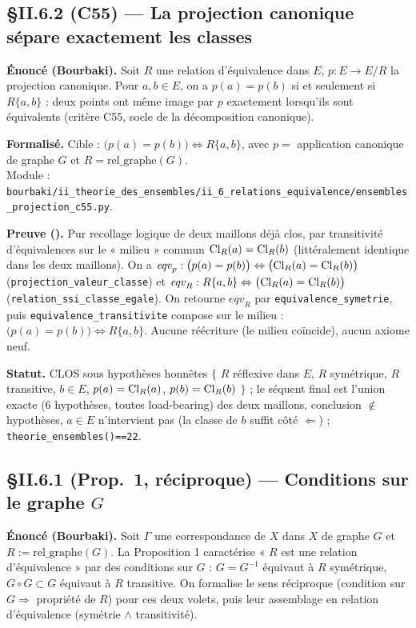 
\subsection{§II.6.2 (C55) --- La projection canonique sépare exactement les classes}
\textbf{Énoncé (Bourbaki).} Soit $R$ une relation d'équivalence dans $E$, $p : E \to E/R$ la
projection canonique. Pour $a, b \in E$, on a $p(a) = p(b)$ si et seulement si $R\{a,b\}$ :
deux points ont même image par $p$ exactement lorsqu'ils sont équivalents (critère C55, socle
de la décomposition canonique).

\textbf{Formalisé.} Cible : $\bigl(p(a) = p(b)\bigr) \Leftrightarrow R\{a,b\}$, avec
$p = $ application canonique de graphe $G$ et $R = \mathrm{rel\_graphe}(G)$. \\
Module : \texttt{bourbaki/ii\_theorie\_des\_ensembles/ii\_6\_relations\_equivalence/ensembles\_projection\_c55.py}.

\textbf{Preuve (\Nstar).} Pur recollage logique de deux maillons déjà clos, par transitivité
d'équivalences sur le « milieu » commun $\mathrm{Cl}_R(a) = \mathrm{Cl}_R(b)$ (littéralement identique dans les
deux maillons). On a $\mathit{eqv}_p : \bigl(p(a)=p(b)\bigr) \Leftrightarrow \bigl(\mathrm{Cl}_R(a)=\mathrm{Cl}_R(b)\bigr)$
(\texttt{projection\_valeur\_classe}) et $\mathit{eqv}_R : R\{a,b\} \Leftrightarrow \bigl(\mathrm{Cl}_R(a)=\mathrm{Cl}_R(b)\bigr)$
(\texttt{relation\_ssi\_classe\_egale}). On retourne $\mathit{eqv}_R$ par \texttt{equivalence\_symetrie},
puis \texttt{equivalence\_transitivite} compose sur le milieu : $\bigl(p(a)=p(b)\bigr) \Leftrightarrow R\{a,b\}$.
Aucune réécriture (le milieu coïncide), aucun axiome neuf.

\textbf{Statut.} CLOS sous hypothèses honnêtes $\{$ $R$ réflexive dans $E$, $R$ symétrique, $R$
transitive, $b \in E$, $p(a) = \mathrm{Cl}_R(a)$, $p(b) = \mathrm{Cl}_R(b)$ $\}$ ; le séquent final est l'union exacte
(6 hypothèses, toutes load-bearing) des deux maillons, conclusion $\notin$ hypothèses, $a \in E$
n'intervient pas (la classe de $b$ suffit côté $\Leftarrow$) ; \texttt{theorie\_ensembles()==22}.

\subsection{§II.6.1 (Prop.\ 1, réciproque) --- Conditions sur le graphe $G$}
\textbf{Énoncé (Bourbaki).} Soit $\Gamma$ une correspondance de $X$ dans $X$ de graphe $G$ et
$R := \mathrm{rel\_graphe}(G)$. La Proposition 1 caractérise « $R$ est une relation d'équivalence »
par des conditions sur $G$ : $G = G^{-1}$ équivaut à $R$ symétrique, $G \circ G \subset G$ équivaut
à $R$ transitive. On formalise le sens réciproque (condition sur $G \Rightarrow$ propriété de $R$)
pour ces deux volets, puis leur assemblage en relation d'équivalence (symétrie $\wedge$ transitivité).

